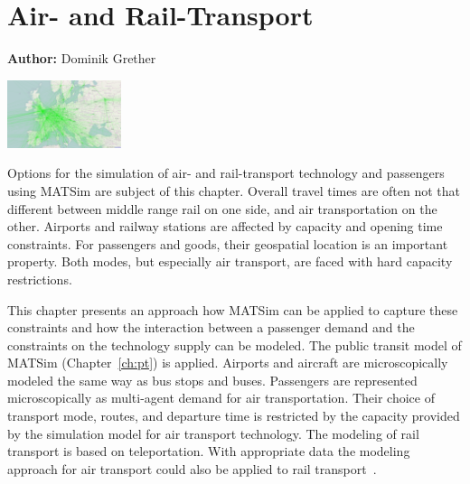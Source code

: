 \chapter{Air- and Rail-Transport}
\label{ch:air}

\hfill \textbf{Author:} Dominik Grether

\begin{center} \includegraphics[width=0.25\textwidth, angle=0]{extending/figures/air/air_network_europe_osm} \end{center}


Options for the simulation of air- and rail-transport technology and passengers using MATSim are subject of this chapter. 
Overall travel times are often not that different between middle range rail on one side, and air transportation on the other.
Airports and railway stations are affected by capacity and opening time constraints. 
For passengers and goods, their geospatial location is an important property. 
Both modes, but especially air transport, are faced with hard capacity restrictions. 

This chapter presents an approach how MATSim can be applied to capture these constraints and how the interaction between a passenger demand and the constraints on the technology supply can be modeled. 
The public transit model of MATSim (Chapter~\ref{ch:pt}) is applied. %
Airports and aircraft are microscopically modeled the same way as bus stops and buses. 
Passengers are represented microscopically as multi-agent demand for air transportation. 
Their choice of transport mode, routes, and departure time is restricted by the capacity provided by the simulation model for air transport technology. 
The modeling of rail transport is based on teleportation. 
With appropriate data the modeling approach for air transport could also be applied to rail transport~\citep{Quick2012BARailTraffic}.  

